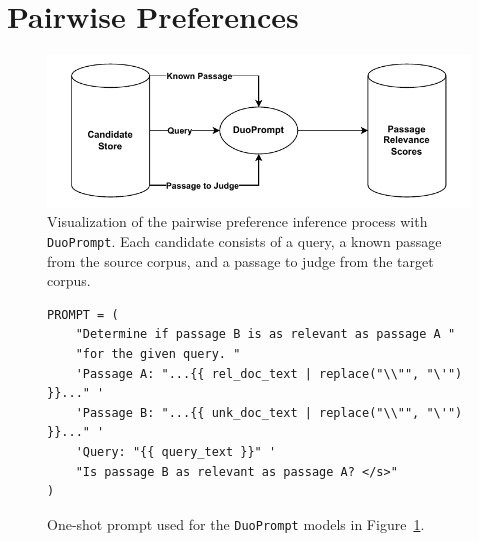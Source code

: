 \section{Pairwise Preferences}\label{pairwise-transfering-relevance-labels-across-datasets}

\begin{figure}[t]
    \centering
    \includegraphics[width=\textwidth]{./graphics/drawio/pairwise_preferences.pdf}
    \caption{Visualization of the pairwise preference inference process with \texttt{DuoPrompt}. Each candidate consists of a query, a known passage from the source corpus, and a passage to judge from the target corpus.}
    \label{fig:pairwise-preferences}
\end{figure}

\begin{figure}[t]
    \centering
    \begin{tcolorbox}[title=One-Shot Prompt, width=\textwidth]
        \footnotesize
        \begin{verbatim}
PROMPT = (
    "Determine if passage B is as relevant as passage A "
    "for the given query. "
    'Passage A: "...{{ rel_doc_text | replace("\\"", "\'") }}..." '
    'Passage B: "...{{ unk_doc_text | replace("\\"", "\'") }}..." '
    'Query: "{{ query_text }}" '
    "Is passage B as relevant as passage A? </s>"
)
        \end{verbatim}
    \end{tcolorbox}
    \caption{One-shot prompt used for the \texttt{DuoPrompt} models in Figure~\ref{fig:pairwise-preferences}.}
    \label{fig:oneshot-prompt}
\end{figure}

